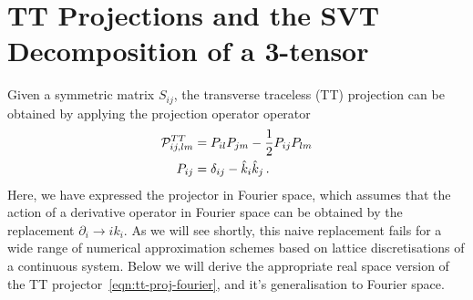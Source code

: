 \documentclass{revtex4}
\begin{document}
\section{TT Projections and the SVT Decomposition of a 3-tensor}
Given a symmetric matrix $S_{ij}$, the transverse traceless (TT) projection can be obtained by applying the projection operator operator
\begin{align}
  \label{eqn:tt-proj-fourier}
  \mathcal{P}^{TT}_{ij,lm} &= P_{il}P_{jm} - \frac{1}{2}P_{ij}P_{lm} \\
  P_{ij} &= \delta_{ij} - \hat{k}_i\hat{k}_j \, .
\end{align}
Here, we have expressed the projector in Fourier space, which assumes that the action of a derivative operator in Fourier space can be obtained by the replacement $\partial_i \to ik_i$.
As we will see shortly, this naive replacement fails for a wide range of numerical approximation schemes based on lattice discretisations of a continuous system.
Below we will derive the appropriate real space version of the TT projector~\eqref{eqn:tt-proj-fourier}, and it's generalisation to Fourier space.
\end{document}

